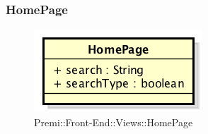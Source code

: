 %	
%	
%	
%	
	
	
\subsubsection{HomePage}
	\begin{figure}[h]
		\centering
		\includegraphics[width=0.3\linewidth]{img/premi_front_end_views_homepage}
		\caption[Premi::Front-End::Views::HomePage]{Premi::Front-End::Views::HomePage}
	\end{figure}
	
